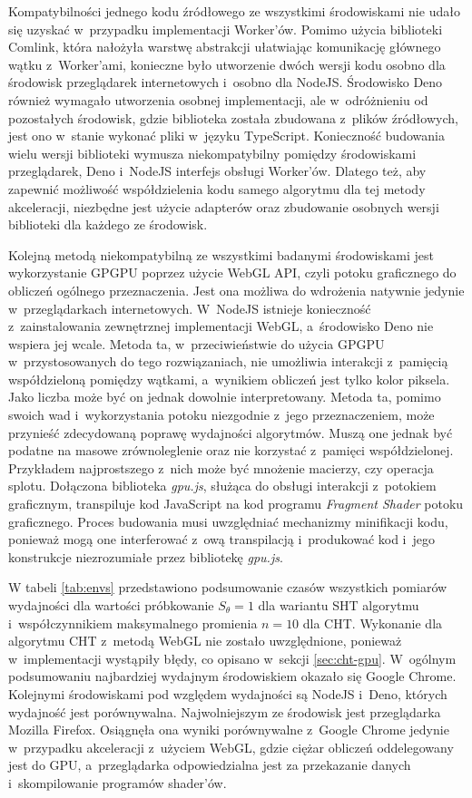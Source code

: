 Kompatybilności jednego kodu źródłowego ze wszystkimi środowiskami nie udało się uzyskać w~przypadku implementacji Worker'ów. Pomimo użycia biblioteki Comlink, która nałożyła warstwę abstrakcji ułatwiając komunikację głównego wątku z~Worker'ami, konieczne było utworzenie dwóch wersji kodu osobno dla środowisk przeglądarek internetowych i~osobno dla NodeJS. Środowisko Deno również wymagało utworzenia osobnej implementacji, ale w~odróżnieniu od pozostałych środowisk, gdzie biblioteka została zbudowana z~plików źródłowych, jest ono w~stanie wykonać pliki w~języku TypeScript. Konieczność budowania wielu wersji biblioteki wymusza niekompatybilny pomiędzy środowiskami przeglądarek, Deno i~NodeJS interfejs obsługi Worker'ów. Dlatego też, aby zapewnić możliwość współdzielenia kodu samego algorytmu dla tej metody akceleracji, niezbędne jest użycie adapterów oraz zbudowanie osobnych wersji biblioteki dla każdego ze środowisk.

Kolejną metodą niekompatybilną ze wszystkimi badanymi środowiskami jest wykorzystanie GPGPU poprzez użycie WebGL API, czyli potoku graficznego do obliczeń ogólnego przeznaczenia. Jest ona możliwa do wdrożenia natywnie jedynie w~przeglądarkach internetowych. W~NodeJS istnieje konieczność z~zainstalowania zewnętrznej implementacji WebGL, a~środowisko Deno nie wspiera jej wcale. Metoda ta, w~przeciwieństwie do użycia GPGPU w~przystosowanych do tego rozwiązaniach, nie umożliwia interakcji z~pamięcią współdzieloną pomiędzy wątkami, a~wynikiem obliczeń jest tylko kolor piksela. Jako liczba może być on jednak dowolnie interpretowany. Metoda ta, pomimo swoich wad i~wykorzystania potoku niezgodnie z~jego przeznaczeniem, może przynieść zdecydowaną poprawę wydajności algorytmów. Muszą one jednak być podatne na masowe zrównoleglenie oraz nie korzystać z~pamięci współdzielonej. Przykładem najprostszego z~nich może być mnożenie macierzy, czy operacja splotu. Dołączona biblioteka \textit{gpu.js}, służąca do obsługi interakcji z~potokiem graficznym, transpiluje kod JavaScript na kod programu \textit{Fragment Shader} potoku graficznego. Proces budowania musi uwzględniać mechanizmy minifikacji kodu, ponieważ mogą one interferować z~ową transpilacją i~produkować kod i~jego konstrukcje niezrozumiałe przez bibliotekę \textit{gpu.js}.



W tabeli \ref{tab:envs} przedstawiono podsumowanie czasów wszystkich pomiarów wydajności dla wartości próbkowanie $S_\theta=1$ dla wariantu SHT algorytmu i~współczynnikiem maksymalnego promienia $n=10$ dla CHT. Wykonanie dla algorytmu CHT z~metodą WebGL nie zostało uwzględnione, ponieważ w~implementacji wystąpiły błędy, co opisano w~sekcji \ref{sec:cht-gpu}. W~ogólnym podsumowaniu najbardziej wydajnym środowiskiem okazało się Google Chrome. Kolejnymi środowiskami pod względem wydajności są NodeJS i~Deno, których wydajność jest porównywalna. Najwolniejszym ze środowisk jest przeglądarka Mozilla Firefox. Osiągnęła ona wyniki porównywalne z~Google Chrome jedynie w~przypadku akceleracji z~użyciem WebGL, gdzie ciężar obliczeń oddelegowany jest do GPU, a~przeglądarka odpowiedzialna jest za przekazanie danych i~skompilowanie programów shader'ów.

